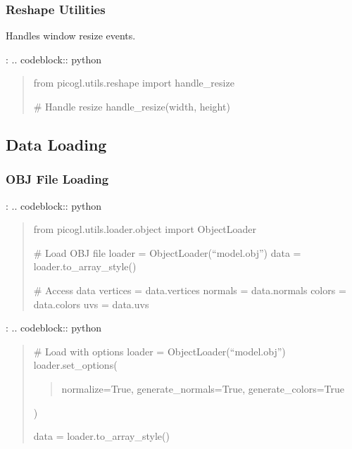 \documentclass[a4paper,10pt,english,openany,oneside]{sphinxmanual}
\begin{document}
\subsubsection{Reshape Utilities}
\label{\detokenize{api/utils:reshape-utilities}}
\sphinxAtStartPar
Handles window resize events.

\sphinxAtStartPar
{}:
.. code\sphinxhyphen{}block:: python
\begin{quote}

\sphinxAtStartPar
from picogl.utils.reshape import handle\_resize

\sphinxAtStartPar
\# Handle resize
handle\_resize(width, height)
\end{quote}


\subsection{Data Loading}
\label{\detokenize{api/utils:data-loading}}

\subsubsection{OBJ File Loading}
\label{\detokenize{api/utils:obj-file-loading}}
\sphinxAtStartPar
{}:
.. code\sphinxhyphen{}block:: python
\begin{quote}

\sphinxAtStartPar
from picogl.utils.loader.object import ObjectLoader

\sphinxAtStartPar
\# Load OBJ file
loader = ObjectLoader(“model.obj”)
data = loader.to\_array\_style()

\sphinxAtStartPar
\# Access data
vertices = data.vertices
normals = data.normals
colors = data.colors
uvs = data.uvs
\end{quote}

\sphinxAtStartPar
{}:
.. code\sphinxhyphen{}block:: python
\begin{quote}

\sphinxAtStartPar
\# Load with options
loader = ObjectLoader(“model.obj”)
loader.set\_options(
\begin{quote}

\sphinxAtStartPar
normalize=True,
generate\_normals=True,
generate\_colors=True
\end{quote}

\sphinxAtStartPar
)

\sphinxAtStartPar
data = loader.to\_array\_style()
\end{quote}
\end{document}
